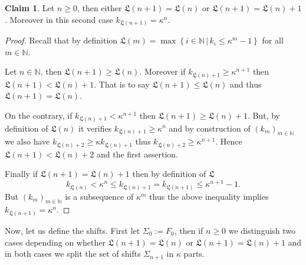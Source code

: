 \documentclass[english, 11pt, a4paper]{article}
\theoremstyle{definition}
\newtheorem{Claim}[Def]{Claim}
\numberwithin{equation}{section}
\newcommand{\bN}{\mathbb{N}}
\newcommand{\Landing}{\mathfrak{L}}
\begin{document}
\begin{Claim} \label{Claim:Landingnplusun}
  Let $n\geq 0$, then either $\Landing(n+1)=\Landing (n)$ or
  $\Landing(n+1)=\Landing (n)+1$. Moreover in this second case
  $k_{\Landing(n+1)}=\kappa^{n}$. 
\end{Claim}
\begin{proof} Recall that by definition $\Landing (m)=\max
  \left\{i\in \bN\, | \, k_i \leq \kappa^m-1 \right\}$ for all $m\in \bN$.

  Let
  $n\in \bN$, then $\Landing(n+1)\geq \Landing (n)$. Moreover if $k_{\Landing
    (n)+1}\geq \kappa^{n+1}$ then $\Landing(n+1)< \Landing(n)+1$. That is to say
  $\Landing(n+1)\leq \Landing(n)$ and thus $\Landing(n+1)=\Landing (n)$.

  On the contrary, if $k_{\Landing(n)+1}<\kappa^{n+1}$ then $\Landing(n+1)\geq
  \Landing (n)+1$. But, by definition of $\Landing (n)$ it verifies $k_{\Landing
    (n)+1}\geq \kappa^{n}$ and by 
  construction of $(k_m)_{m\in \bN}$ we also have $k_{\Landing(n)+2} \geq \kappa
  k_{\Landing (n)+1}$ thus $k_{\Landing(n)+2} \geq \kappa^{n+1}$. Hence
  $\Landing(n+1)<\Landing(n)+2 $ and the first assertion.

  Finally if $\Landing(n+1)=\Landing(n)+1$ then by definition of $\Landing$
  \begin{equation*}
    k_{\Landing(n)} < \kappa^n \leq k_{\Landing(n)+1}=k_{\Landing(n+1)} \leq \kappa^{n+1}-1.
  \end{equation*}
  But $(k_m)_{m\in \bN}$ is a subsequence of $\kappa^m$ thus the above
  inequality implies $k_{\Landing(n+1)}=\kappa^n$. 
\end{proof}

Now, let us define the shifts. First let $\Sigma_0:=F_0$, then if $n\geq 0$
we distinguish two cases depending on whether $\Landing(n+1)=\Landing (n)$ or
$\Landing(n+1)=\Landing (n)+1$ and in both cases 
we split the set of shifts $\Sigma_{n+1}$ in $\kappa$ parts.
\end{document}
